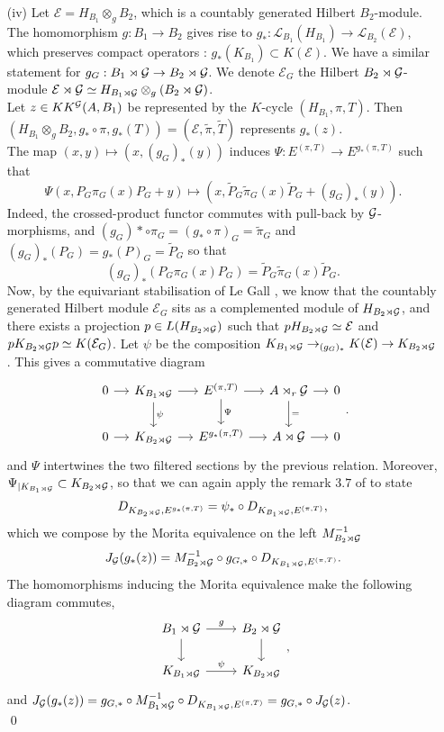 \begin{dem}
\begin{enumerate}
\item[(iv)] Let $\mathcal E = H_{B_1}\otimes_g B_2$, which is a countably generated Hilbert $B_2$-module. The homomorphism $g:B_1\rightarrow B_2$ gives rise to $g_* : \mathcal L_{B_1}(H_{B_1})\rightarrow \mathcal L_{B_2}(\mathcal E)$, which preserves compact operators : $g_*(K_{B_1})\subset K(\mathcal E)$. We have a similar statement for $g_G : B_1\rtimes\mathcal G\rightarrow B_2\rtimes\mathcal G$. We denote $\mathcal E_G$ the Hilbert $B_2\rtimes\mathcal G$-module $\mathcal E\rtimes\mathcal G\simeq H_{B_1\rtimes \mathcal G}\otimes_g (B_2\rtimes \mathcal G)$.\\

Let $z\in KK^\mathcal G(A,B_1)$ be represented by the $K$-cycle $(H_{B_1},\pi,T)$. Then $(H_{B_1}\otimes_g B_2,g_*\circ\pi, g_*(T))=(\mathcal E, \tilde\pi,\tilde T)$ represents $g_*(z)$.\\

The map $(x,y)\mapsto (x, (g_G)_*(y))$ induces $\Psi :E^{(\pi,T)}\rightarrow  E^{g_*(\pi,T)} $ such that
\[\Psi(x,P_G \pi_G(x) P_G +y)\mapsto (x,\tilde P_G \tilde\pi_G(x) \tilde P_G+(g_G)_*(y)).\]
Indeed, the crossed-product functor commutes with pull-back by $\mathcal G$-morphisms, and $(g_G)*\circ\pi_G=(g_*\circ\pi)_G=\tilde \pi_G$ and $(g_G)_*(P_G) = g_*(P)_G=\tilde P_G$ so that 
\[(g_G)_*(P_G \pi_G(x) P_G)=\tilde P_G \tilde\pi_G(x) \tilde P_G. \]
Now, by the equivariant stabilisation of Le Gall \cite{LeGall}, we know that the countably generated Hilbert module $\mathcal E_G$ sits as a complemented module of $H_{B_2\rtimes\mathcal G}$, and there exists a projection $p\in L(H_{B_2\rtimes\mathcal G})$ such that $pH_{B_2\rtimes\mathcal G}\simeq \mathcal E$ and $pK_{B_2\rtimes\mathcal G}p\simeq K(\mathcal E_G)$. Let $\psi$ be the composition $K_{B_1\rtimes \mathcal G}\rightarrow_{(g_G)_*} K(\mathcal E)\rightarrow K_{B_2\rtimes \mathcal G}$. This gives a commutative diagram 
\[\begin{tikzcd}[column sep = small]
0\arrow{r} & K_{B_1\rtimes \G}\arrow{r}\arrow{d}{\psi} & E^{(\pi,T)} \arrow{r}\arrow{d}{\Psi}& A\rtimes_r \G\arrow{r}\arrow{d}{=} & 0\\
0\arrow{r} & K_{B_2\rtimes \G}\arrow{r} & E^{g_*(\pi,T)} \arrow{r}& A\rtimes \G\arrow{r} & 0
\end{tikzcd}.\]
and $\Psi$ intertwines the two filtered sections by the previous relation. Moreover, $\Psi_{|K_{B_1\rtimes \mathcal G}}\subset K_{B_2\rtimes\mathcal G}$, so that we can again apply the remark $3.7$ of \cite{OY2} to state
\[ D_{K_{B_2\rtimes \mathcal G},E^{g_*(\pi,T)}}=\psi_*\circ D_{K_{B_1\rtimes \mathcal G},E^{(\pi,T)}},\]
which we compose by the Morita equivalence on the left $M_{B_2\rtimes\mathcal G}^{-1}$
\[J_\mathcal G(g_*(z)) = M_{B_2\rtimes\mathcal G}^{-1}\circ g_{G,*}\circ D_{K_{B_1\rtimes \mathcal G},E^{(\pi,T)}}.\]
The homomorphisms inducing the Morita equivalence make the following diagram commutes,
\[\begin{tikzcd}B_1\rtimes\G\arrow{r}{g}\arrow{d} & B_2\rtimes \G\arrow{d} \\ K_{B_1\rtimes\G } \arrow{r}{\psi}& K_{B_2\rtimes\G }\end{tikzcd},\]
and $J_\mathcal G(g_*(z))= g_{G,*}\circ M_{B_1\rtimes\mathcal G}^{-1}\circ D_{K_{B_1\rtimes \mathcal G},E^{(\pi,T)}}=g_{G,*}\circ J_\mathcal G(z)$.\\
\qed
\end{enumerate}
\end{dem}


